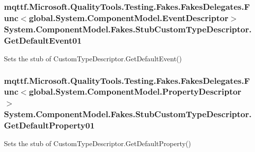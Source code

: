 \hypertarget{class_system_1_1_component_model_1_1_fakes_1_1_stub_custom_type_descriptor_a1e523560cb59a7f7b928ce78726a3cf3}{
\subsubsection[{Get\-Default\-Event01}]{\setlength{\rightskip}{0pt plus 5cm}mqttf.\-Microsoft.\-Quality\-Tools.\-Testing.\-Fakes.\-Fakes\-Delegates.\-Func$<$global.\-System.\-Component\-Model.\-Event\-Descriptor$>$ System.\-Component\-Model.\-Fakes.\-Stub\-Custom\-Type\-Descriptor.\-Get\-Default\-Event01}}\label{class_system_1_1_component_model_1_1_fakes_1_1_stub_custom_type_descriptor_a1e523560cb59a7f7b928ce78726a3cf3}


Sets the stub of Custom\-Type\-Descriptor.\-Get\-Default\-Event()

\hypertarget{class_system_1_1_component_model_1_1_fakes_1_1_stub_custom_type_descriptor_a2f7ed50ca8b015cea1037492e220bbba}{
\subsubsection[{Get\-Default\-Property01}]{\setlength{\rightskip}{0pt plus 5cm}mqttf.\-Microsoft.\-Quality\-Tools.\-Testing.\-Fakes.\-Fakes\-Delegates.\-Func$<$global.\-System.\-Component\-Model.\-Property\-Descriptor$>$ System.\-Component\-Model.\-Fakes.\-Stub\-Custom\-Type\-Descriptor.\-Get\-Default\-Property01}}\label{class_system_1_1_component_model_1_1_fakes_1_1_stub_custom_type_descriptor_a2f7ed50ca8b015cea1037492e220bbba}


Sets the stub of Custom\-Type\-Descriptor.\-Get\-Default\-Property()

